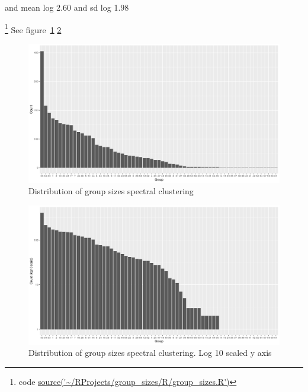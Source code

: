 






and mean log 2.60 and sd log 1.98

\footnote{code \url{source('~/RProjects/group_sizes/R/group_sizes.R')}}
See figure~\ref{fig:group sizes spectral clustering shows power law distribution} \ref{fig:group sizes spectral clustering log 10}
\begin{figure}
    \centering
    \includegraphics[width=\textwidth]{images/Rplot_group_size_spectral.png}
    \caption{Distribution of group sizes spectral clustering}
    \label{fig:group sizes spectral clustering shows power law distribution}
\end{figure}

\begin{figure}
    \centering
    \includegraphics[width=\textwidth]{images/Rplot_spectral_groups_size_log10.png}
    \caption{Distribution of group sizes spectral clustering. Log 10 scaled y axis}
    \label{fig:group sizes spectral clustering log 10}
\end{figure}

